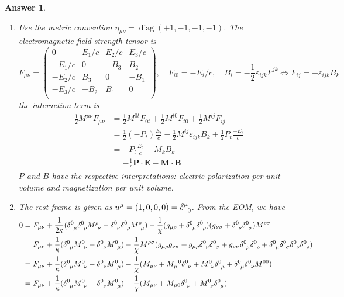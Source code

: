 \documentclass[a4paper]{article}
\DeclareMathOperator{\diag}{diag}
\newtheorem{ans}{Answer}[section]
\theoremstyle{new}
\begin{document}
\begin{ans}
\begin{enumerate}[label=(\alph*)]
\begin{align}
\end{align}
\item Use the metric convention $\eta_{\mu\nu}=\diag(+1,-1,-1,-1)$. The electromagnetic field strength tensor is
$$F_{\mu\nu}=\begin{pmatrix}0&E_1/c&E_2/c&E_3/c\\-E_1/c&0&-B_3&B_2\\-E_2/c&B_3&0&-B_1\\-E_3/c&-B_2&B_1&0\\\end{pmatrix},\quad F_{i0}=-E_i/c,\quad B_i=-\frac{1}{2}\varepsilon_{ijk}F^{jk}\iff F_{ij}=-\varepsilon_{ijk}B_k$$ the interaction term is
\begin{align}
\frac{1}{2}M^{\mu\nu}F_{\mu\nu}&=\frac{1}{2}M^{0t}F_{0t}+\frac{1}{2}M^{t0}F_{t0}+\frac{1}{2}M^{ij}F_{ij}\nonumber\\&=\frac{1}{2}(-P_t)\frac{E_t}{c}-\frac{1}{2}M^{ij}\varepsilon_{ijk}B_k+\frac{1}{2}P_t\frac{-E_t}{c}\nonumber\\&=-P_t\frac{E_t}{c}-M_kB_k\nonumber\\&=-\frac{1}{c}\mathbf{P}\cdot\mathbf{E}-\mathbf{M}\cdot\mathbf{B}\nonumber
\end{align}
$P$ and $B$ have the respective interpretations: electric polarization per unit volume and magnetization per unit volume.
\item The rest frame is given as $u^\mu=(1,0,0,0)=\tensor*{\delta}{*_{}^{\mu}_{0}}$. From the EOM, we have
\begin{align}
    0&=F_{\mu\nu}+\frac{1}{2\kappa}(\tensor*{\delta}{*_{}^{0}_{\mu}}\tensor*{\delta}{*_{}^{0}_{\rho}}\tensor*{M}{*_{}^{\rho}_{\nu}}-\tensor*{\delta}{*_{}^{0}_{\nu}}\tensor*{\delta}{*_{}^{0}_{\rho}}\tensor*{M}{*_{}^{\rho}_{\mu}})-\frac{1}{\chi}(g_{\mu\rho}+\tensor*{\delta}{*_{}^{0}_{\mu}}\tensor*{\delta}{*_{}^{0}_{\rho}})(g_{\nu\sigma}+\tensor*{\delta}{*_{}^{0}_{\nu}}\tensor*{\delta}{*_{}^{0}_{\sigma}})M^{\rho\sigma}\nonumber\\&=F_{\mu\nu}+\frac{1}{\kappa}(\tensor*{\delta}{*_{}^{0}_{\mu}}\tensor*{M}{*_{}^{0}_{\nu}}-\tensor*{\delta}{*_{}^{0}_{\nu}}\tensor*{M}{*_{}^{0}_{\mu}})-\frac{1}{\chi}M^{\rho\sigma}(g_{\mu\rho}g_{\nu\sigma}+g_{\mu\rho}\tensor*{\delta}{*_{}^{0}_{\nu}}\tensor*{\delta}{*_{}^{0}_{\sigma}}+g_{\nu\sigma}\tensor*{\delta}{*_{}^{0}_{\mu}}\tensor*{\delta}{*_{}^{0}_{\rho}}+\tensor*{\delta}{*_{}^{0}_{\mu}}\tensor*{\delta}{*_{}^{0}_{\sigma}}\tensor*{\delta}{*_{}^{0}_{\nu}}\tensor*{\delta}{*_{}^{0}_{\rho}})\nonumber\\&=F_{\mu\nu}+\frac{1}{\kappa}(\tensor*{\delta}{*_{}^{0}_{\mu}}\tensor*{M}{*_{}^{0}_{\nu}}-\tensor*{\delta}{*_{}^{0}_{\nu}}\tensor*{M}{*_{}^{0}_{\mu}})-\frac{1}{\chi}(M_{\mu\nu}+\tensor*{M}{*^{}_{\mu}^{0}}\tensor*{\delta}{*_{}^{0}_{\nu}}+\tensor*{M}{*_{}^{0}_{\nu}}\tensor*{\delta}{*_{}^{0}_{\mu}}+\tensor*{\delta}{*_{}^{0}_{\mu}}\tensor*{\delta}{*_{}^{0}_{\nu}}M^{00})\nonumber\\&=F_{\mu\nu}+\frac{1}{\kappa}(\tensor*{\delta}{*_{}^{0}_{\mu}}\tensor*{M}{*_{}^{0}_{\nu}}-\tensor*{\delta}{*_{}^{0}_{\nu}}\tensor*{M}{*_{}^{0}_{\mu}})-\frac{1}{\chi}(M_{\mu\nu}+M_{\mu0}\tensor*{\delta}{*_{}^{0}_{\nu}}+\tensor*{M}{*_{}^{0}_{\nu}}\tensor*{\delta}{*_{}^{0}_{\mu}})\nonumber

\end{align}
\end{enumerate}
\end{ans}
\end{document}
